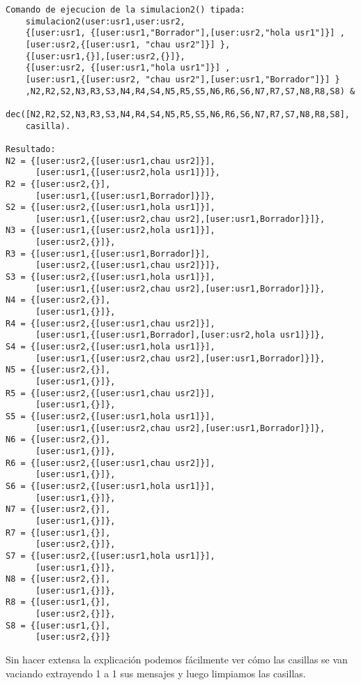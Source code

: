\begin{verbatim}
Comando de ejecucion de la simulacion2() tipada:
    simulacion2(user:usr1,user:usr2,
    {[user:usr1, {[user:usr1,"Borrador"],[user:usr2,"hola usr1"]}] ,
    [user:usr2,{[user:usr1, "chau usr2"]}] },
    {[user:usr1,{}],[user:usr2,{}]},
    {[user:usr2, {[user:usr1,"hola usr1"]}] ,
    [user:usr1,{[user:usr2, "chau usr2"],[user:usr1,"Borrador"]}] }
    ,N2,R2,S2,N3,R3,S3,N4,R4,S4,N5,R5,S5,N6,R6,S6,N7,R7,S7,N8,R8,S8) &
    dec([N2,R2,S2,N3,R3,S3,N4,R4,S4,N5,R5,S5,N6,R6,S6,N7,R7,S7,N8,R8,S8],
    casilla).

Resultado:
N2 = {[user:usr2,{[user:usr1,chau usr2]}],
      [user:usr1,{[user:usr2,hola usr1]}]},  
R2 = {[user:usr2,{}],
      [user:usr1,{[user:usr1,Borrador]}]},  
S2 = {[user:usr2,{[user:usr1,hola usr1]}],
      [user:usr1,{[user:usr2,chau usr2],[user:usr1,Borrador]}]},  
N3 = {[user:usr1,{[user:usr2,hola usr1]}],
      [user:usr2,{}]},  
R3 = {[user:usr1,{[user:usr1,Borrador]}],
      [user:usr2,{[user:usr1,chau usr2]}]},  
S3 = {[user:usr2,{[user:usr1,hola usr1]}],
      [user:usr1,{[user:usr2,chau usr2],[user:usr1,Borrador]}]},  
N4 = {[user:usr2,{}],
      [user:usr1,{}]},  
R4 = {[user:usr2,{[user:usr1,chau usr2]}],
      [user:usr1,{[user:usr1,Borrador],[user:usr2,hola usr1]}]},  
S4 = {[user:usr2,{[user:usr1,hola usr1]}],
      [user:usr1,{[user:usr2,chau usr2],[user:usr1,Borrador]}]},  
N5 = {[user:usr2,{}],
      [user:usr1,{}]},  
R5 = {[user:usr2,{[user:usr1,chau usr2]}],
      [user:usr1,{}]},  
S5 = {[user:usr2,{[user:usr1,hola usr1]}],
      [user:usr1,{[user:usr2,chau usr2],[user:usr1,Borrador]}]},  
N6 = {[user:usr2,{}],
      [user:usr1,{}]},  
R6 = {[user:usr2,{[user:usr1,chau usr2]}],
      [user:usr1,{}]},  
S6 = {[user:usr2,{[user:usr1,hola usr1]}],
      [user:usr1,{}]},  
N7 = {[user:usr2,{}],
      [user:usr1,{}]},  
R7 = {[user:usr1,{}],
      [user:usr2,{}]},  
S7 = {[user:usr2,{[user:usr1,hola usr1]}],
      [user:usr1,{}]},  
N8 = {[user:usr2,{}],
      [user:usr1,{}]},  
R8 = {[user:usr1,{}],
      [user:usr2,{}]},  
S8 = {[user:usr1,{}],
      [user:usr2,{}]}
\end{verbatim}
Sin hacer extensa la explicación podemos fácilmente ver cómo las casillas se van vaciando extrayendo 1 a 1 sus mensajes y luego limpiamos las casillas.

